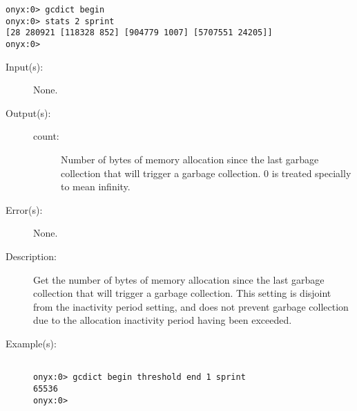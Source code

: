 \begin{description}
\begin{description}
\begin{verbatim}
onyx:0> gcdict begin
onyx:0> stats 2 sprint
[28 280921 [118328 852] [904779 1007] [5707551 24205]]
onyx:0>
		\end{verbatim}
	\end{description}
\label{gcdict:threshold}
\item[{\onyxop{--}{threshold}{count}}: ]
	\begin{description}\item[]
	\item[Input(s): ] None.
	\item[Output(s): ]
		\begin{description}\item[]
		\item[count: ]
			Number of bytes of memory allocation since the last
			garbage collection that will trigger a garbage
			collection.  0 is treated specially to mean infinity.
		\end{description}
	\item[Error(s): ] None.
	\item[Description: ]
		Get the number of bytes of memory allocation since the last
		garbage collection that will trigger a garbage collection.  This
		setting is disjoint from the inactivity period setting, and does
		not prevent garbage collection due to the allocation inactivity
		period having been exceeded.
	\item[Example(s): ]\begin{verbatim}

onyx:0> gcdict begin threshold end 1 sprint
65536
onyx:0>
		\end{verbatim}
	\end{description}
\end{description}
